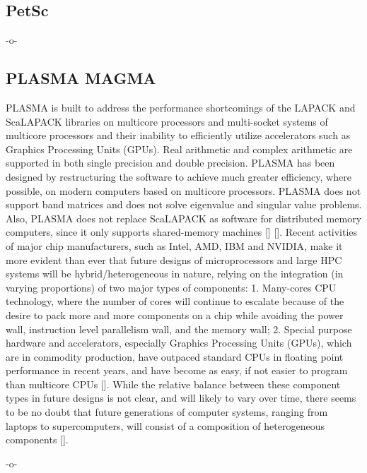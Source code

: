 \subsection{PetSc}

-o-

\subsection{PLASMA MAGMA}

PLASMA is built to address the performance shortcomings of the LAPACK
and ScaLAPACK libraries on multicore processors and multi-socket
systems of multicore processors and their inability to efficiently
utilize accelerators such as Graphics Processing Units (GPUs). Real
arithmetic and complex arithmetic are supported in both single
precision and double precision.  PLASMA has been designed by
restructuring the software to achieve much greater efficiency, where
possible, on modern computers based on multicore processors. PLASMA
does not support band matrices and does not solve eigenvalue and
singular value problems. Also, PLASMA does not replace ScaLAPACK as
software for distributed memory computers, since it only supports
shared-memory machines [\cite{paper-plasma-magma-1}]
[\cite{www-plasma-1}]. Recent activities of major chip manufacturers,
such as Intel, AMD, IBM and NVIDIA, make it more evident than ever
that future designs of microprocessors and large HPC systems will be
hybrid/heterogeneous in nature, relying on the integration (in varying
proportions) of two major types of components: 1. Many-cores CPU
technology, where the number of cores will continue to escalate
because of the desire to pack more and more components on a chip while
avoiding the power wall, instruction level parallelism wall, and the
memory wall; 2. Special purpose hardware and accelerators, especially
Graphics Processing Units (GPUs), which are in commodity production,
have outpaced standard CPUs in floating point performance in recent
years, and have become as easy, if not easier to program than
multicore CPUs [\cite{paper-plasma-magma-2, paper-plasma-magma-3}].
While the relative balance between these component types in future
designs is not clear, and will likely to vary over time, there seems
to be no doubt that future generations of computer systems, ranging
from laptops to supercomputers, will consist of a composition of
heterogeneous components
[\cite{paper-plasma-magma-4,paper-plasma-magma-5,paper-plasma-magma-6}].


-o-

